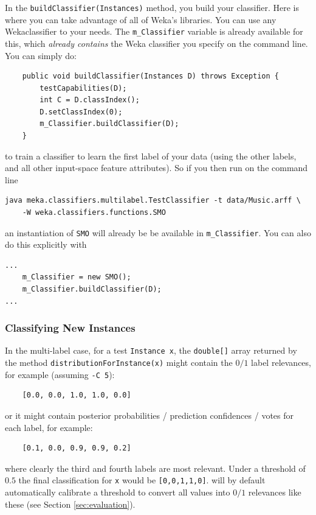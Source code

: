 \documentclass[11pt]{article}
\newcommand{\MEKA}{Meka}
\newcommand{\WEKA}{Weka}
\begin{document}
In the \texttt{buildClassifier(Instances)} method, you build your classifier. Here is where you can take advantage of all of \WEKA's libraries. You can use any \WEKA classifier to your needs. The \texttt{m\_Classifier} variable is already available for this, which \textit{already contains} the \WEKA{} classifier you specify on the command line. You can simply do:
{
\lstset{basicstyle=\small\ttfamily,breaklines=true,language=java,frame=L,xleftmargin=\parindent}
\begin{lstlisting}
    public void buildClassifier(Instances D) throws Exception {
        testCapabilities(D);
        int C = D.classIndex();
        D.setClassIndex(0);
        m_Classifier.buildClassifier(D);
    }
\end{lstlisting}
}
to train a classifier to learn the first label of your data (using the other labels, and all other input-space feature attributes). So if you then run on the command line
{
\lstset{basicstyle=\small\ttfamily,breaklines=true,language=java,frame=L,xleftmargin=\parindent}
\begin{lstlisting}
java meka.classifiers.multilabel.TestClassifier -t data/Music.arff \
	-W weka.classifiers.functions.SMO
\end{lstlisting}
}
an instantiation of \texttt{SMO} will already be be available in \texttt{m\_Classifier}. You can also do this explicitly with
{
\lstset{basicstyle=\small\ttfamily,breaklines=true,language=java,frame=L,xleftmargin=\parindent}
\begin{lstlisting}
...
    m_Classifier = new SMO();
    m_Classifier.buildClassifier(D);
...
\end{lstlisting}
}

\subsubsection{Classifying New Instances}

In the multi-label case, for a test \texttt{Instance x}, the \texttt{double[]} array returned by the method \texttt{distributionForInstance(x)} might contain the $0/1$ label relevances, for example (assuming \texttt{-C 5}):
\begin{lstlisting}
	[0.0, 0.0, 1.0, 1.0, 0.0]
\end{lstlisting} 
or it might contain posterior probabilities / prediction confidences / votes for each label, for example:
\begin{lstlisting}
	[0.1, 0.0, 0.9, 0.9, 0.2]
\end{lstlisting} 
where clearly the third and fourth labels are most relevant. Under a threshold of $0.5$ the final classification for \texttt{x} would be \texttt{[0,0,1,1,0]}. \framework{\MEKA} will by default automatically calibrate a threshold to convert all values into $0/1$ relevances like these (see Section \ref{sec:evaluation}). 
\end{document}
